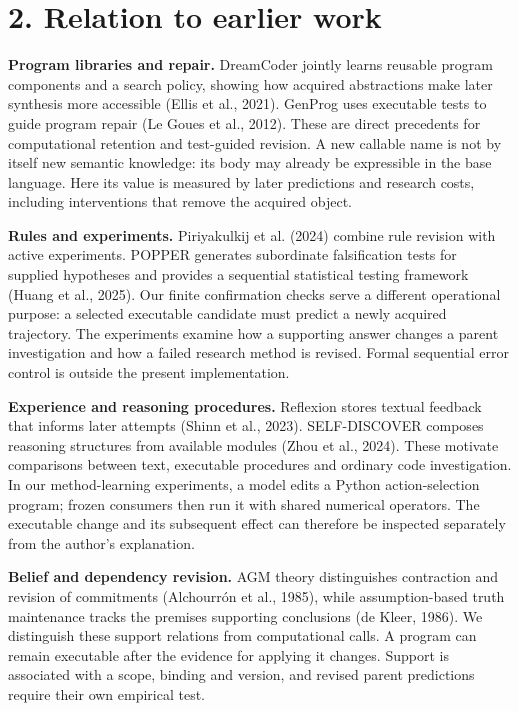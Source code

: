 \documentclass[11pt,a4paper]{article}
\begin{document}
\section*{2. Relation to earlier work}

\textbf{Program libraries and repair.} DreamCoder jointly learns reusable program components and a search policy, showing how acquired abstractions make later synthesis more accessible (Ellis et al., 2021). GenProg uses executable tests to guide program repair (Le Goues et al., 2012). These are direct precedents for computational retention and test-guided revision. A new callable name is not by itself new semantic knowledge: its body may already be expressible in the base language. Here its value is measured by later predictions and research costs, including interventions that remove the acquired object.


\textbf{Rules and experiments.} Piriyakulkij et al. (2024) combine rule revision with active experiments. POPPER generates subordinate falsification tests for supplied hypotheses and provides a sequential statistical testing framework (Huang et al., 2025). Our finite confirmation checks serve a different operational purpose: a selected executable candidate must predict a newly acquired trajectory. The experiments examine how a supporting answer changes a parent investigation and how a failed research method is revised. Formal sequential error control is outside the present implementation.


\textbf{Experience and reasoning procedures.} Reflexion stores textual feedback that informs later attempts (Shinn et al., 2023). SELF-DISCOVER composes reasoning structures from available modules (Zhou et al., 2024). These motivate comparisons between text, executable procedures and ordinary code investigation. In our method-learning experiments, a model edits a Python action-selection program; frozen consumers then run it with shared numerical operators. The executable change and its subsequent effect can therefore be inspected separately from the author's explanation.


\textbf{Belief and dependency revision.} AGM theory distinguishes contraction and revision of commitments (Alchourrón et al., 1985), while assumption-based truth maintenance tracks the premises supporting conclusions (de Kleer, 1986). We distinguish these support relations from computational calls. A program can remain executable after the evidence for applying it changes. Support is associated with a scope, binding and version, and revised parent predictions require their own empirical test.
\end{document}
